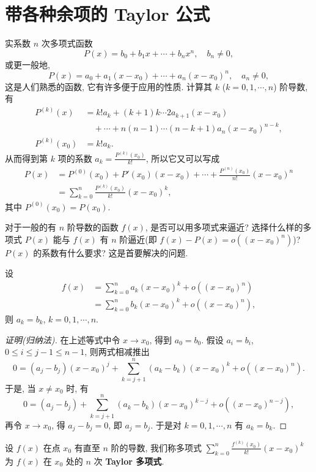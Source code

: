 \section{带各种余项的 Taylor 公式}\label{sec:4.1}

实系数 $n$ 次多项式函数
\[
P(x)=b_{0}+b_{1}x+\cdots+b_{n}x^{n},\quad b_{n}\neq 0,
\]
或更一般地,
\[
P(x)=a_{0}+a_{1}(x-x_{0})+\cdots+a_{n}(x-x_{0})^{n},\quad a_{n}\neq 0,
\]
这是人们熟悉的函数, 它有许多便于应用的性质. 计算其 $k$ ($k=0,1,\cdots,n$) 阶导数, 有
\begin{align*}
P^{(k)}(x)&=k!a_{k}+(k+1)k\cdots 2a_{k+1}(x-x_{0})\\
&\quad+\cdots+n(n-1)\cdots(n-k+1)a_{n}(x-x_{0})^{n-k},\\
P^{(k)}(x_{0})&=k!a_{k}.
\end{align*}
从而得到第 $k$ 项的系数 $a_{k}=\frac{P^{(k)}(x_{0})}{k!}$, 所以它又可以写成
\begin{align*}
P(x)&=P^{(0)}(x_{0})+P'(x_{0})(x-x_{0})+\cdots+\frac{P^{(n)}(x_{0})}{n!}(x-x_{0})^{n}\\
&=\sum_{k=0}^{n}\frac{P^{(k)}(x_{0})}{k!}(x-x_{0})^{k},
\end{align*}
其中 $P^{(0)}(x_{0})=P(x_{0})$.

对于一般的有 $n$ 阶导数的函数 $f(x)$, 是否可以用多项式来逼近? 选择什么样的多项式 $P(x)$ 能与 $f(x)$ 有 $n$ 阶逼近(即 $f(x)-P(x)=o((x-x_{0})^{n})$)? $P(x)$ 的系数有什么要求? 这是首要解决的问题.

\begin{theorem}[惟一性]\label{thm:4.1.1}
设
\begin{align*}
f(x)&=\sum_{k=0}^{n}a_{k}(x-x_{0})^{k}+o((x-x_{0})^{n})\\
&=\sum_{k=0}^{n}b_{k}(x-x_{0})^{k}+o((x-x_{0})^{n}),
\end{align*}
则 $a_{k}=b_{k}$, $k=0,1,\cdots,n$.
\end{theorem}

\begin{proof}[证明(归纳法)]
在上述等式中令 $x\to x_{0}$, 得到 $a_{0}=b_{0}$. 假设 $a_{i}=b_{i}$, $0\leqslant i\leqslant j-1\leqslant n-1$, 则两式相减推出
\[
0=(a_{j}-b_{j})(x-x_{0})^{j}+\sum_{k=j+1}^{n}(a_{k}-b_{k})(x-x_{0})^{k}+o((x-x_{0})^{n}).
\]
于是, 当 $x\neq x_{0}$ 时, 有
\[
0=(a_{j}-b_{j})+\sum_{k=j+1}^{n}(a_{k}-b_{k})(x-x_{0})^{k-j}+o((x-x_{0})^{n-j}),
\]
再令 $x\to x_{0}$, 得 $a_{j}-b_{j}=0$, 即 $a_{j}=b_{j}$. 于是对 $k=0,1,\cdots,n$ 有 $a_{k}=b_{k}$.
\end{proof}

设 $f(x)$ 在点 $x_{0}$ 有直至 $n$ 阶的导数, 我们称多项式 $\sum\limits_{k=0}^{n}\frac{f^{(k)}(x_{0})}{k!}(x-x_{0})^{k}$ 为 $f(x)$ 在 $x_{0}$ 处的 $n$ 次 \textbf{Taylor 多项式}.


